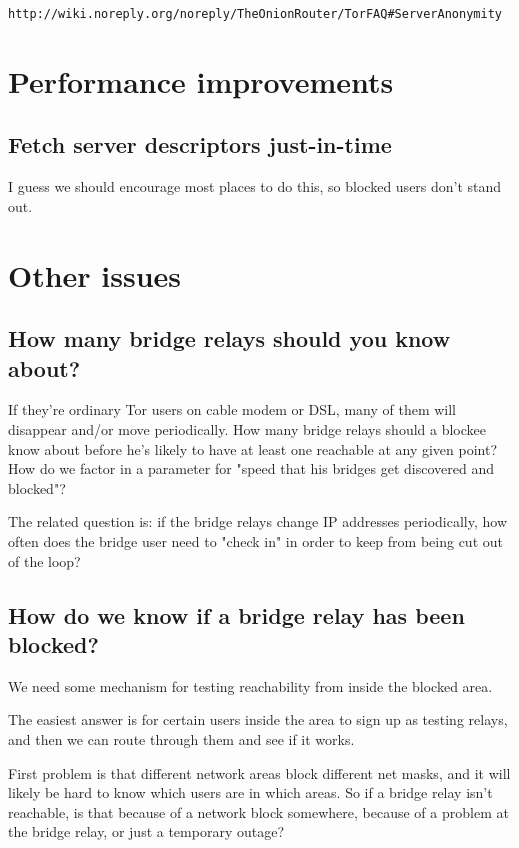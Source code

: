\documentclass{llncs}
\begin{document}
\begin{verbatim}
http://wiki.noreply.org/noreply/TheOnionRouter/TorFAQ#ServerAnonymity
\end{verbatim}



\section{Performance improvements}

\subsection{Fetch server descriptors just-in-time}

I guess we should encourage most places to do this, so blocked
users don't stand out.

\section{Other issues}

\subsection{How many bridge relays should you know about?}

If they're ordinary Tor users on cable modem or DSL, many of them will
disappear and/or move periodically. How many bridge relays should a
blockee know
about before he's likely to have at least one reachable at any given point?
How do we factor in a parameter for "speed that his bridges get discovered
and blocked"?

The related question is: if the bridge relays change IP addresses
periodically, how often does the bridge user need to "check in" in order
to keep from being cut out of the loop?

\subsection{How do we know if a bridge relay has been blocked?}

We need some mechanism for testing reachability from inside the
blocked area.

The easiest answer is for certain users inside the area to sign up as
testing relays, and then we can route through them and see if it works.

First problem is that different network areas block different net masks,
and it will likely be hard to know which users are in which areas. So
if a bridge relay isn't reachable, is that because of a network block
somewhere, because of a problem at the bridge relay, or just a temporary
outage?
\end{document}
